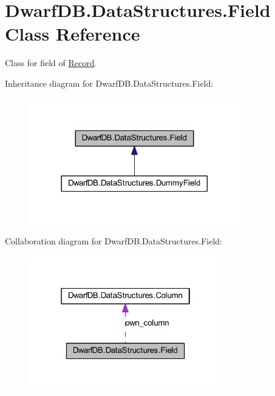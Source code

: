 \hypertarget{class_dwarf_d_b_1_1_data_structures_1_1_field}{
\section{DwarfDB.DataStructures.Field Class Reference}
\label{class_dwarf_d_b_1_1_data_structures_1_1_field}
}


Class for field of \hyperlink{class_dwarf_d_b_1_1_data_structures_1_1_record}{Record}.  




Inheritance diagram for DwarfDB.DataStructures.Field:
\nopagebreak
\begin{figure}[H]
\begin{center}
\leavevmode
\includegraphics[width=260pt]{class_dwarf_d_b_1_1_data_structures_1_1_field__inherit__graph}
\end{center}
\end{figure}


Collaboration diagram for DwarfDB.DataStructures.Field:\nopagebreak
\begin{figure}[H]
\begin{center}
\leavevmode
\includegraphics[width=238pt]{class_dwarf_d_b_1_1_data_structures_1_1_field__coll__graph}
\end{center}
\end{figure}
